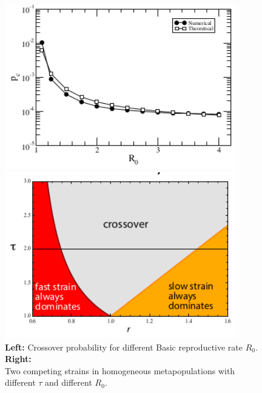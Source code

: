 \documentclass[../main/main.tex]{subfiles}
\begin{document}
\begin{figure}[h!]
\begin{minipage}[c]{0.5\linewidth}
\centering
\includegraphics[width=0.9\textwidth]{../lessons/image/16/image10a.png}
\end{minipage}
\begin{minipage}[]{0.5\linewidth}
\centering
\includegraphics[width=0.9\textwidth]{../lessons/image/16/image10b.png}
\end{minipage}
\caption{\label{fig:16_10} \textbf{Left:} Crossover probability for different Basic reproductive rate $R_0$. \textbf{Right:}\\ Two competing strains in homogeneous metapopulations with different $\tau$ and different $R_0$.}
\end{figure}
\end{document}
